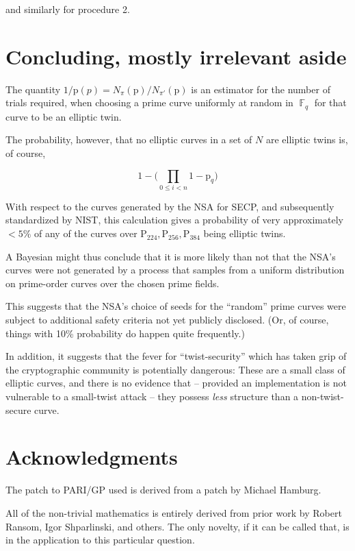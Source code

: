 \documentclass[11pt,fleqn]{article}
\newcommand{\p}{\ensuremath{\mathup{p}} }
\newcommand{\Pa}{\ensuremath{\mathup{P}_{224}} }
\newcommand{\Pb}{\ensuremath{\mathup{P}_{256}} }
\newcommand{\Pc}{\ensuremath{\mathup{P}_{384}} }
\begin{document}
and similarly for procedure 2.

\section{Concluding, mostly irrelevant aside}

The quantity $1 / \p(p) = N_{\pi}(\p) / N_{\pi'}(\p)$ is an estimator for
the number of trials required, when choosing a prime curve uniformly at
random in $\BbbF_q$ for that curve to be an elliptic twin.

The probability, however, that no elliptic curves in a set of $N$
are elliptic twins is, of course,

\begin{equation}
1 - \lparen \prod_{0 \leq i < n} 1 - \p_q \rparen
\end{equation}

With respect to the curves generated by the NSA for SECP, and
subsequently standardized by NIST, this calculation gives a probability
of very approximately $< 5\%$ of any of the curves over $\Pa, \Pb, \Pc$
being elliptic twins.

A Bayesian might thus conclude that it is more likely than not that
the NSA's curves were not generated by a process that samples from
a uniform distribution on prime-order curves over the chosen prime
fields.

This suggests that the NSA's choice of seeds for the ``random'' prime
curves were subject to additional safety criteria not yet publicly
disclosed. (Or, of course, things with 10\% probability do happen quite
frequently.)

In addition, it suggests that the fever for ``twist-security'' which
has taken grip of the cryptographic community is potentially dangerous:
These are a small class of elliptic curves, and there is no evidence that
-- provided an implementation is not vulnerable to a small-twist attack --
they possess \emph{less} structure than a non-twist-secure curve.

\section{Acknowledgments}

The patch to PARI/GP used is derived from a patch by Michael Hamburg.

All of the non-trivial mathematics is entirely derived from prior work by
Robert Ransom, Igor Shparlinski, and others. The only novelty, if it can
be called that, is in the application to this particular question.
\end{document}
